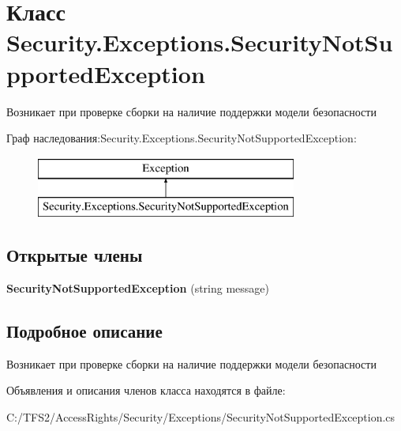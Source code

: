 \hypertarget{class_security_1_1_exceptions_1_1_security_not_supported_exception}{}\section{Класс Security.\+Exceptions.\+Security\+Not\+Supported\+Exception}
\label{class_security_1_1_exceptions_1_1_security_not_supported_exception}


Возникает при проверке сборки на наличие поддержки модели безопасности  


Граф наследования\+:Security.\+Exceptions.\+Security\+Not\+Supported\+Exception\+:\begin{figure}[H]
\begin{center}
\leavevmode
\includegraphics[height=2.000000cm]{d8/de1/class_security_1_1_exceptions_1_1_security_not_supported_exception}
\end{center}
\end{figure}
\subsection*{Открытые члены}
\begin{DoxyCompactItemize}
\item 
\mbox{\label{class_security_1_1_exceptions_1_1_security_not_supported_exception_acc5c9fe53adb4c361b469d3f4dc1b013}} 
{\bfseries Security\+Not\+Supported\+Exception} (string message)
\end{DoxyCompactItemize}


\subsection{Подробное описание}
Возникает при проверке сборки на наличие поддержки модели безопасности 



Объявления и описания членов класса находятся в файле\+:\begin{DoxyCompactItemize}
\item 
C\+:/\+T\+F\+S2/\+Access\+Rights/\+Security/\+Exceptions/Security\+Not\+Supported\+Exception.\+cs\end{DoxyCompactItemize}
